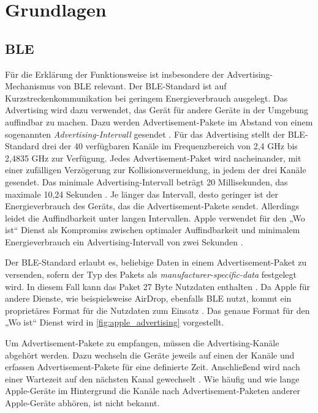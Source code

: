 \section{Grundlagen}
\label{sec:grundlagen}


\subsection{\ac{BLE}}
\label{sec:ble}
Für die Erklärung der Funktionsweise ist insbesondere der Advertising-Mechanismus von \ac{BLE} relevant.
Der \ac{BLE}-Standard ist auf Kurzstreckenkommunikation bei geringem Energieverbrauch ausgelegt.
Das Advertising wird dazu verwendet, das Gerät für andere Geräte in der Umgebung auffindbar zu machen.
Dazu werden Advertisement-Pakete im Abstand von einem sogenannten \textit{Advertising-Intervall} gesendet \cite{Spec_BLE_5.3}.
Für das Advertising stellt der \ac{BLE}-Standard drei der 40 verfügbaren Kanäle im Frequenzbereich von 2,4 GHz bis 2,4835 GHz zur Verfügung.
Jedes Advertisement-Paket wird nacheinander, mit einer zufälligen Verzögerung zur Kollisionsvermeidung, in jedem der drei Kanäle gesendet.
Das minimale Advertising-Intervall beträgt 20 Millisekunden, das maximale 10,24 Sekunden \cite{Spec_BLE_5.3}.
Je länger das Intervall, desto geringer ist der Energieverbrauch des Geräts, das die Advertisement-Pakete sendet.
Allerdings leidet die Auffindbarkeit unter langen Intervallen.
Apple verwendet für den „Wo ist“ Dienst als Kompromiss zwischen optimaler Auffindbarkeit und minimalem Energieverbrauch ein Advertising-Intervall von zwei Sekunden \cite{Apple_FindMySpec}.


Der \ac{BLE}-Standard erlaubt es, beliebige Daten in einem Advertisement-Paket zu versenden, sofern der Typ des Pakets als \textit{manufacturer-specific-data} festgelegt wird.
In diesem Fall kann das Paket 27 Byte Nutzdaten enthalten \cite{Spec_BLE_5.3}.
Da Apple für andere Dienste, wie beispielsweise AirDrop, ebenfalls \ac{BLE} nutzt, kommt ein proprietäres Format für die Nutzdaten zum Einsatz \cite{Heinrich_FindMy}.
Das genaue Format für den „Wo ist“ Dienst wird in \autoref{fig:apple_advertising} vorgestellt.

Um Advertisement-Pakete zu empfangen, müssen die Advertising-Kanäle abgehört werden.
Dazu wechseln die Geräte jeweils auf einen der Kanäle und erfassen Advertisement-Pakete für eine definierte Zeit.
Anschließend wird nach einer Wartezeit auf den nächsten Kanal gewechselt \cite{Spec_BLE_5.3}.
Wie häufig und wie lange Apple-Geräte im Hintergrund die Kanäle nach Advertisement-Paketen anderer Apple-Geräte abhören, ist nicht bekannt.


